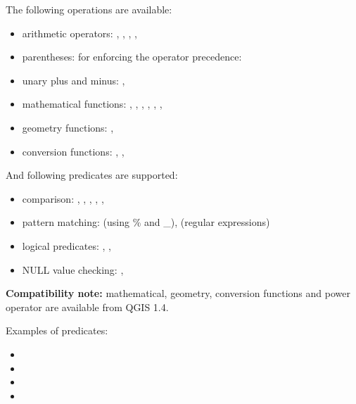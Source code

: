 \documentclass[letterpaper,10pt,english]{manual}
\begin{document}
The following operations are available:
\begin{itemize}
\item {} 
arithmetic operators: \code{+}, \code{-}, \code{*}, \code{/}, \code{\textasciicircum{}}

\item {} 
parentheses: for enforcing the operator precedence: 

\item {} 
unary plus and minus: , 

\item {} 
mathematical functions: , , , , , , 

\item {} 
geometry functions: , 

\item {} 
conversion functions: , , 

\end{itemize}

And following predicates are supported:
\begin{itemize}
\item {} 
comparison: \code{=}, \code{!=}, \code{\textgreater{}}, \code{\textgreater{}=}, \code{\textless{}}, \code{\textless{}=}

\item {} 
pattern matching:  (using \% and \_), \code{\textasciitilde{}} (regular expressions)

\item {} 
logical predicates: , , 

\item {} 
NULL value checking: , 

\end{itemize}

\textbf{Compatibility note:} mathematical, geometry, conversion functions and power operator \code{\textasciicircum{}} are available from QGIS 1.4.

Examples of predicates:
\begin{itemize}
\item {} 

\item {} 

\item {} 

\item {} 

\end{itemize}
\end{document}
